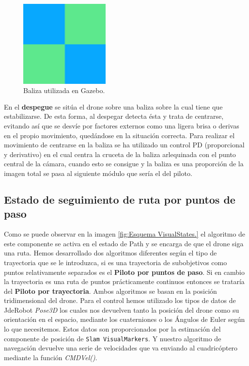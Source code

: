 \begin{figure}[H]
	\begin{center}
		\includegraphics[width=0.4\textwidth]{imag/IMG33.png}
				\caption{Baliza utilizada en Gazebo.}
		\label{fig:Baliza.}	
	\end{center}
\end{figure}

\hspace{1cm} En el \textbf{despegue} se sitúa el drone sobre una baliza sobre la cual tiene que estabilizarse. De esta forma, al despegar detecta ésta y trata de centrarse, evitando así que se desvíe por factores externos como una ligera brisa o derivas en el propio movimiento, quedándose en la situación correcta. Para realizar el movimiento de centrarse en la baliza se ha utilizado un control PD (proporcional y derivativo) en el cual centra la cruceta de la baliza arlequinada con el punto central de la cámara, cuando esto se consigue y la baliza es una proporción de la imagen total se pasa al siguiente módulo que sería el del piloto.

\subsection{Estado de seguimiento de ruta por puntos de paso}
\hspace{1cm} Como se puede observar en la imagen \ref{fig:Esquema VisualStates.} el algoritmo de este componente se activa en el estado de Path y se encarga de que el drone siga una ruta. Hemos desarrollado dos algoritmos diferentes según el tipo de trayectoria que se le introduzca, si es una trayectoria de subobjetivos como puntos relativamente separados es el \textbf{Piloto por puntos de paso}. Si en cambio la trayectoria es una ruta de puntos prácticamente continuos entonces se trataría del \textbf{Piloto por trayectoria}. Ambos algoritmos se basan en la posición tridimensional del drone. Para el control hemos utilizado los tipos de datos de JdeRobot \textit{Pose3D} los cuales nos devuelven tanto la posición del drone como su orientación en el espacio, mediante los cuaterniones o los Ángulos de Euler según lo que necesitemos. Estos datos son proporcionados por la estimación del componente de posición de \texttt{Slam VisualMarkers}. Y nuestro algoritmo de navegación devuelve una serie de velocidades que va enviando al cuadricóptero mediante la función \textit{CMDVel()}.


